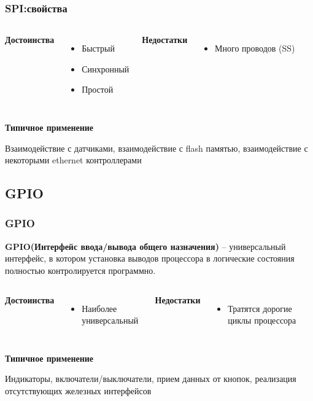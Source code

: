 \begin{frame}
  \frametitle{SPI:свойства}
  \begin{columns}
    \column{4cm}
    \begin{center}
      {\bf\large Достоинства}
    \end{center}
    \begin{itemize}
       \item Быстрый
       \item Синхронный
       \item Простой
    \end{itemize}
    \column{4cm}
    \begin{center}
      {\bf\large Недостатки}
    \end{center}
    \begin{itemize}
       \item Много проводов (SS)
    \end{itemize}
  \end{columns}
  \begin{center}
    {\bf\large Типичное применение}
  \end{center}
  Взаимодействие с датчиками, взаимодействие с flash памятью, взаимодействие с некоторыми ethernet контроллерами
\end{frame}
\subsection{GPIO}
\begin{frame}
  \frametitle{GPIO}
  \textbf{GPIO(Интерфейс ввода/вывода общего назначения)} -- универсальный интерфейс, в котором установка выводов процессора в логические состояния полностью контролируется программно.
  

  \begin{columns}
    \column{4cm}
    \begin{center}
      {\bf\large Достоинства}
    \end{center}
    \begin{itemize}
       \item Наиболее универсальный
    \end{itemize}
    \column{4cm}
    \begin{center}
      {\bf\large Недостатки}
    \end{center}
    \begin{itemize}
       \item Тратятся дорогие циклы процессора
    \end{itemize}
  \end{columns}
  \begin{center}
    {\bf\large Типичное применение}
  \end{center}
  Индикаторы, включатели/выключатели, прием данных от кнопок, реализация отсутствующих железных интерфейсов

\end{frame}
